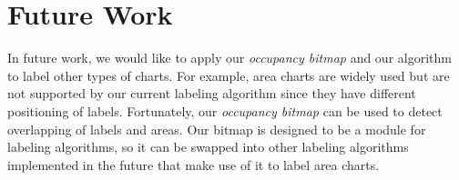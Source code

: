 \section{Future Work}

In future work, we would like to apply our \emph{occupancy bitmap} and our algorithm to label other types of charts.
For example, area charts are widely used but are not supported by our current labeling algorithm since they have different positioning of labels.
Fortunately, our \emph{occupancy bitmap} can be used to detect overlapping of labels and areas.
Our bitmap is designed to be a module for labeling algorithms, so it can be swapped into other labeling algorithms implemented in the future that make use of it to label area charts.
